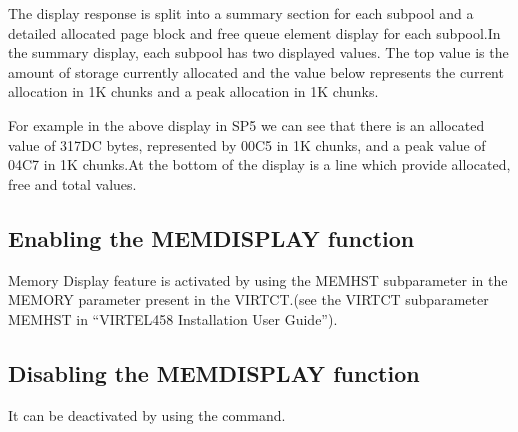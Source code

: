 \documentclass[letterpaper,10pt,english]{sphinxmanual}
\begin{document}
The display response is split into a summary section for each subpool and a detailed allocated page block and free queue element display for each subpool.In the summary display, each subpool has two displayed values. The top value is the amount of storage currently allocated and the value below represents the current allocation in 1K chunks and a peak allocation in 1K chunks.

For example in the above display in SP5 we can see that there is an allocated value of 317DC bytes, represented by 00C5 in 1K chunks, and a peak value of 04C7 in 1K chunks.At the bottom of the display is a line which provide allocated, free and total values.

\ignorespaces 

\subsection{Enabling the MEMDISPLAY function}
\label{\detokenize{audit_operations_ and_performance:enabling-the-memdisplay-function}}\label{\detokenize{audit_operations_ and_performance:index-12}}
Memory Display feature is activated by using the MEMHST subparameter in the MEMORY parameter present in the VIRTCT.(see the VIRTCT subparameter MEMHST in “VIRTEL458 Installation User Guide”).

\ignorespaces 

\subsection{Disabling the MEMDISPLAY function}
\label{\detokenize{audit_operations_ and_performance:disabling-the-memdisplay-function}}\label{\detokenize{audit_operations_ and_performance:index-13}}
It can be deactivated by using the command.

\begin{sphinxVerbatim}[commandchars=\\\{\}]
 
\end{sphinxVerbatim}
\end{document}
